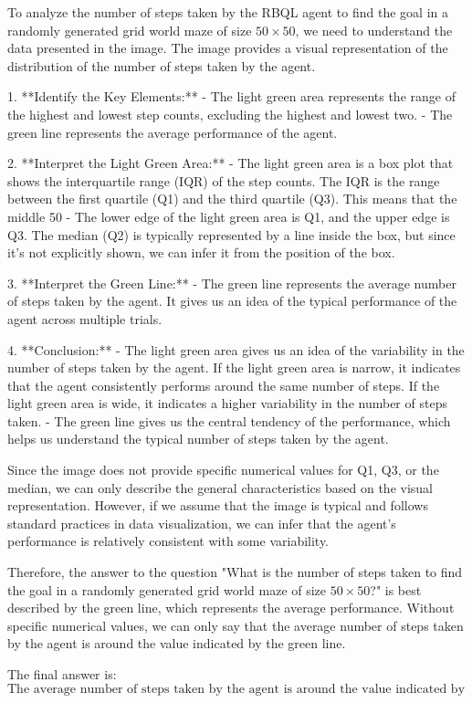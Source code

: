 To analyze the number of steps taken by the RBQL agent to find the goal in a randomly generated grid world maze of size \(50 \times 50\), we need to understand the data presented in the image. The image provides a visual representation of the distribution of the number of steps taken by the agent.

1. **Identify the Key Elements:**
   - The light green area represents the range of the highest and lowest step counts, excluding the highest and lowest two.
   - The green line represents the average performance of the agent.

2. **Interpret the Light Green Area:**
   - The light green area is a box plot that shows the interquartile range (IQR) of the step counts. The IQR is the range between the first quartile (Q1) and the third quartile (Q3). This means that the middle 50%
   - The lower edge of the light green area is Q1, and the upper edge is Q3. The median (Q2) is typically represented by a line inside the box, but since it's not explicitly shown, we can infer it from the position of the box.

3. **Interpret the Green Line:**
   - The green line represents the average number of steps taken by the agent. It gives us an idea of the typical performance of the agent across multiple trials.

4. **Conclusion:**
   - The light green area gives us an idea of the variability in the number of steps taken by the agent. If the light green area is narrow, it indicates that the agent consistently performs around the same number of steps. If the light green area is wide, it indicates a higher variability in the number of steps taken.
   - The green line gives us the central tendency of the performance, which helps us understand the typical number of steps taken by the agent.

Since the image does not provide specific numerical values for Q1, Q3, or the median, we can only describe the general characteristics based on the visual representation. However, if we assume that the image is typical and follows standard practices in data visualization, we can infer that the agent's performance is relatively consistent with some variability.

Therefore, the answer to the question "What is the number of steps taken to find the goal in a randomly generated grid world maze of size \(50 \times 50\)?" is best described by the green line, which represents the average performance. Without specific numerical values, we can only say that the average number of steps taken by the agent is around the value indicated by the green line.

The final answer is:
\[
\boxed{\text{The average number of steps taken by the agent is around the value indicated by the green line.}}
\]